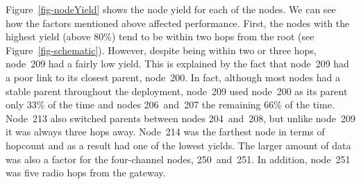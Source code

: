 Figure~\ref{fig-nodeYield} shows the node yield for each of the nodes.
We can see how the factors mentioned above affected performance.
First, the nodes with the highest yield (above 80\%) tend to be within
two hops from the root (see Figure~\ref{fig-schematic}).  However,
despite being within two or three hops, node~209 had a fairly low
yield.  This is explained by the fact that node~209 had a poor link to
its closest parent, node~200.  In fact, although most nodes had a
stable parent throughout the deployment, node~209 used node~200 as its
parent only 33\% of the time and nodes 206~and~207 the remaining 66\%
of the time.  Node~213 also switched parents between nodes
204~and~208, but unlike node~209 it was always three hops away.
Node~214 was the farthest node in terms of hopcount and as a result
had one of the lowest yields.  The larger amount of data was also a
factor for the four-channel nodes, 250~and~251. In addition, node~251
was five radio hops from the gateway.




